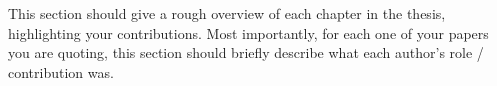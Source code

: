 \authorcontributions

This section should give a rough overview of each chapter in the thesis,
highlighting your contributions.  Most importantly, for each one of your
papers you are quoting, this section should briefly describe what each author's
role / contribution was.

